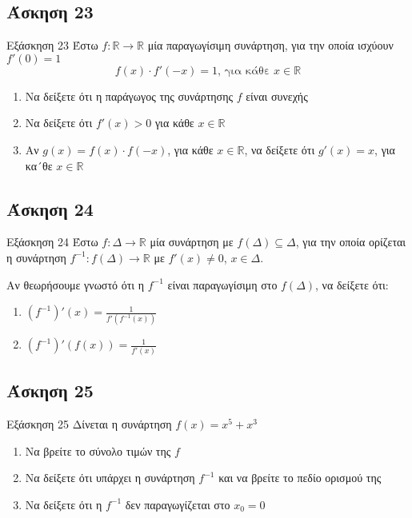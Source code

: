 \documentclass[greek]{beamer}
\begin{document}
\subsection{Άσκηση 23}
\begin{frame}[label=Άσκηση23]{Εξάσκηση 23}
 Έστω $f:\mathbb{R}\to\mathbb{R}$ μία παραγωγίσιμη συνάρτηση, για την οποία ισχύουν $f'(0)=1$
 $$f(x)\cdot f'(-x)=1 \text{, για κάθε } x\in\mathbb{R}$$
 \begin{enumerate}
  \item<1-> Να δείξετε ότι η παράγωγος της συνάρτησης $f$ είναι συνεχής
  \item<2-> Να δείξετε ότι $f'(x)>0$ για κάθε $x\in\mathbb{R}$
  \item<3-> Αν $g(x)=f(x)\cdot f(-x)$, για κάθε $x\in\mathbb{R}$, να δείξετε ότι $g'(x)=x$, για κα´θε $x\in\mathbb{R}$
 \end{enumerate}

\end{frame}

\subsection{Άσκηση 24}
\begin{frame}[label=Άσκηση24]{Εξάσκηση 24}
Έστω $f:Δ\to\mathbb{R}$ μία συνάρτηση με $f(Δ)\subseteq Δ$, για την οποία ορίζεται η συνάρτηση $f^{-1}:f(Δ)\to\mathbb{R}$ με $f'(x)\ne 0$, $x\in Δ$.

Αν θεωρήσουμε γνωστό ότι η $f^{-1}$ είναι παραγωγίσιμη στο $f(Δ)$, να δείξετε ότι:
\begin{enumerate}
 \item<1-> $(f^{-1})'(x)=\frac{1}{f'(f^{-1}(x))}$
 \item<2-> $(f^{-1})'(f(x))=\frac{1}{f'(x)}$
\end{enumerate}

\end{frame}

\subsection{Άσκηση 25}
\begin{frame}[label=Άσκηση25]{Εξάσκηση 25}
  Δίνεται η συνάρτηση $f(x)=x^5+x^3$
  \begin{enumerate}
    \item<1-> Να βρείτε το σύνολο τιμών της $f$
    \item<2-> Να δείξετε ότι υπάρχει η συνάρτηση $f^{-1}$ και να βρείτε το πεδίο ορισμού της
    \item<3-> Να δείξετε ότι η $f^{-1}$ δεν παραγωγίζεται στο $x_0=0$
  \end{enumerate}

\end{frame}
\end{document}
